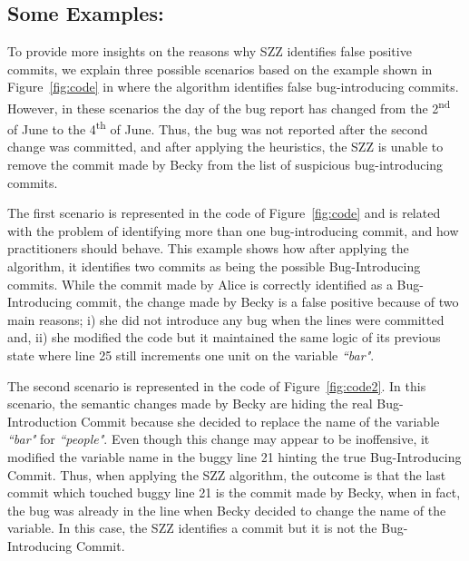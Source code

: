\documentclass[a4paper, 12pt]{book}
\begin{document}

\subsection{Some Examples:}
\label{subsec:examples}
To provide more insights on the reasons why SZZ identifies false positive commits, we explain three possible scenarios based on the example shown in Figure~\ref{fig:code} in where the algorithm identifies false bug-introducing commits. However, in these scenarios the day of the bug report has changed from the 2\textsuperscript{nd} of June to the 4\textsuperscript{th} of June. Thus, the bug was not reported after the second change was committed, and after applying the heuristics, the SZZ is unable to remove the commit made by Becky from the list of suspicious bug-introducing commits.

The first scenario is represented in the code of Figure~\ref{fig:code} and is related with the problem of identifying more than one bug-introducing commit, and how practitioners should behave. This example shows how after applying the algorithm, it identifies two commits as being the possible Bug-Introducing commits. While the commit made by Alice is correctly identified as a Bug-Introducing commit, the change made by Becky is a false positive because of two main reasons; i) she did not introduce any bug when the lines were committed and, ii) she modified the code but it maintained the same logic of its previous state where line 25 still increments one unit on the variable \emph{``bar"}.

The second scenario is represented in the code of Figure~\ref{fig:code2}. In this scenario, the semantic changes made by Becky are hiding the real Bug-Introduction Commit because she decided to replace the name of the variable \emph{``bar"}  for \emph{``people"}. Even though this change may appear to be inoffensive, it modified the variable name in the buggy line 21 hinting the true Bug-Introducing Commit. Thus, when applying the SZZ algorithm, the outcome is that the last commit which touched buggy line 21 is the commit made by Becky, when in fact, the bug was already in the line when Becky decided to change the name of the variable. In this case, the SZZ identifies a commit but it is not the Bug-Introducing Commit.
\end{document}
